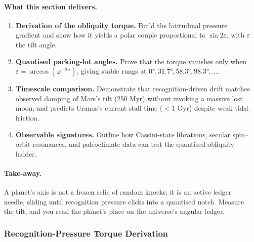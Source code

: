 \documentclass[11pt,oneside]{book}
\begin{document}
\paragraph{What this section delivers.}

\begin{enumerate}[label=\arabic*.,leftmargin=*,itemsep=3pt]
\item \textbf{Derivation of the obliquity torque.}  
      Build the latitudinal pressure gradient and show how it yields a
      polar couple proportional to \(\sin2\varepsilon\), with
      \(\varepsilon\) the tilt angle.
\item \textbf{Quantised parking-lot angles.}  
      Prove that the torque vanishes only when
      \(\varepsilon=\arccos(\varphi^{-2n})\), giving stable rungs at
      \(0°, 31.7°, 58.3°, 98.3°,\dots\).
\item \textbf{Timescale comparison.}  
      Demonstrate that recognition-driven drift matches observed
      damping of Mars’s tilt (250 Myr) without invoking a massive
      lost moon, and predicts Uranus’s current stall time
      (\(<\!1\) Gyr) despite weak tidal friction.
\item \textbf{Observable signatures.}  
      Outline how Cassini-state librations, secular spin–orbit
      resonances, and paleoclimate data can test the quantised
      obliquity ladder.
\end{enumerate}

\paragraph{Take-away.}
A planet’s axis is not a frozen relic of random knocks; it is an
active ledger needle, sliding until recognition pressure clicks into a
quantised notch.  Measure the tilt, and you read the planet’s place on
the universe’s angular ledger.



\subsubsection{Recognition-Pressure Torque Derivation}
\label{ss:obl-torque}
\end{document}
